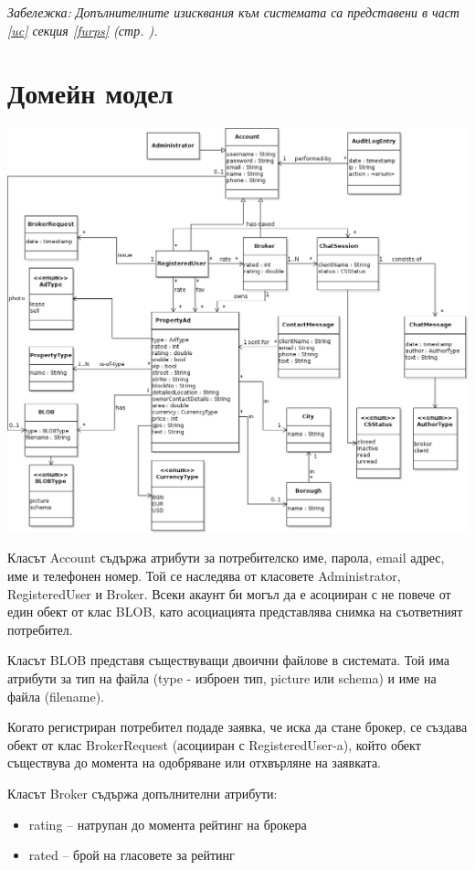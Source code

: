 \documentclass[a4paper]{article}
\begin{document}
\emph{Забележка: Допълнителните изисквания към системата са представени в част \ref{uc} секция \ref{furps} (стр. \pageref{furps}).} 

\clearpage
\section{Домейн модел}

\begin{center}
\includegraphics[scale=0.48,keepaspectratio=true]{domain-model}
\end{center}

Класът Account съдържа атрибути за потребителско име, парола, email адрес, име и телефонен номер. Той се наследява от класовете Administrator, RegisteredUser и Broker. Всеки акаунт би могъл да е асоцииран с не повече от един обект от клас BLOB, като асоциацията представлява снимка на съответният потребител.

Класът BLOB представя съществуващи двоични файлове в системата. Той има атрибути за тип на файла (type - изброен тип, picture или schema) и име на файла (filename).


Когато регистриран потребител подаде заявка, че иска да стане брокер, се създава обект от клас BrokerRequest (асоцииран с RegisteredUser-a), който обект съществува до момента на одобряване или отхвърляне на заявката.

Класът Broker съдържа допълнителни атрибути:
\begin{itemize}
\item rating -- натрупан до момента рейтинг на брокера
\item rated -- брой на гласовете за рейтинг
\end{itemize}
\end{document}
